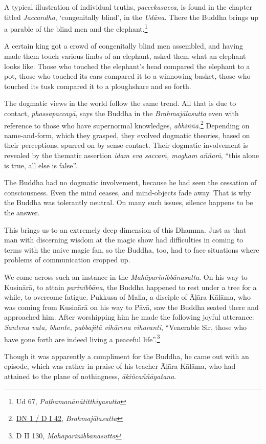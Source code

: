 A typical illustration of individual truths, \emph{paccekasacca}, is found in the chapter titled \emph{Jaccandha}, `congenitally blind', in the \emph{Udāna}. There the Buddha brings up a parable of the blind men and the elephant.\footnote{Ud 67, \emph{Paṭhamanānātitthiyasutta}}

A certain king got a crowd of congenitally blind men assembled, and having made them touch various limbs of an elephant, asked them what an elephant looks like. Those who touched the elephant's head compared the elephant to a pot, those who touched its ears compared it to a winnowing basket, those who touched its tusk compared it to a ploughshare and so forth.

The dogmatic views in the world follow the same trend. All that is due to contact, \emph{phassapaccayā}, says the Buddha in the \emph{Brahmajālasutta} even with reference to those who have supernormal knowledges, \emph{abhiññā}.\footnote{\href{https://suttacentral.net/dn1/pli/ms}{DN 1 / D I 42}, \emph{Brahmajālasutta}} Depending on name-and-form, which they grasped, they evolved dogmatic theories, based on their perceptions, spurred on by sense-contact. Their dogmatic involvement is revealed by the thematic assertion \emph{idam eva saccaṁ, mogham aññaṁ}, ``this alone is true, all else is false''.

The Buddha had no dogmatic involvement, because he had seen the cessation of consciousness. Even the mind ceases, and mind-objects fade away. That is why the Buddha was tolerantly neutral. On many such issues, silence happens to be the answer.

This brings us to an extremely deep dimension of this Dhamma. Just as that man with discerning wisdom at the magic show had difficulties in coming to terms with the naive magic fan, so the Buddha, too, had to face situations where problems of communication cropped up.

We come across such an instance in the \emph{Mahāparinibbānasutta}. On his way to Kusinārā, to attain \emph{parinibbāna}, the Buddha happened to rest under a tree for a while, to overcome fatigue. Pukkusa of Malla, a disciple of Āḷāra Kālāma, who was coming from Kusinārā on his way to Pāvā, saw the Buddha seated there and approached him. After worshipping him he made the following joyful utterance: \emph{Santena vata, bhante, pabbajitā vihārena viharanti}, ``Venerable Sir, those who have gone forth are indeed living a peaceful life''.\footnote{D II 130, \emph{Mahāparinibbānasutta}}

Though it was apparently a compliment for the Buddha, he came out with an episode, which was rather in praise of his teacher Āḷāra Kālāma, who had attained to the plane of nothingness, \emph{ākiñcaññāyatana}.


